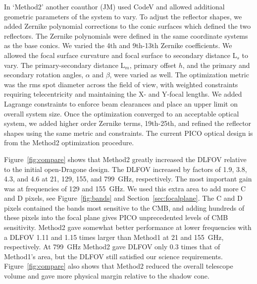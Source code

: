 \documentclass[]{spie}  %
\newcommand{\comr}[1]{\textcolor{red}{#1}}
\begin{document}
In `Method2' another coauthor (JM) used 
CodeV and allowed additional geometric parameters of the system to vary.  To adjust the 
reflector shapes, we added Zernike polynomial corrections to the conic surfaces which defined the two reflectors.
The Zernike polynomials were defined in the same coordinate systems as the base conics.  
We varied the 4th and 9th-13th Zernike coefficients. We allowed the focal surface curvature 
and focal surface to secondary distance L$_s$ to vary.  The primary-secondary distance L$_m$, primary offset $h$, 
and the primary and secondary rotation angles, $\alpha$ and $\beta$, were varied as well.  The optimization 
metric was the rms spot diameter across the field of view, with weighted constraints requiring telecentricity and 
maintaining the X- and Y-focal lengths.  We added Lagrange constraints 
to enforce beam clearances and place an upper limit on overall system size.  Once the optimization converged to 
an acceptable optical system, we added higher order Zernike terms, 19th-25th, and refined 
the reflector shapes using the same metric and constraints. 
The current PICO optical design is from the Method2 optimization procedure.  %

Figure~\ref{fig:compare} shows that Method2 greatly increased the DLFOV relative to the initial open-Dragone design.  
The DLFOV increased by factors of 1.9, 3.8, 4.3, and 4.6 at 21, 129, 155, and 799~GHz, respectively.  
The most important gain was at frequencies of 129 and 155~GHz. We used this extra area to add 
more C and D pixels, see Figure~\ref{fig:bands} and Section~\ref{sec:focalplane}. The C and D pixels contained the bands 
most sensitive to the CMB, and adding hundreds of these pixels into the focal plane  
gives PICO unprecedented levels of CMB sensitivity. 
Method2 gave somewhat better performance at lower 
frequencies with a DLFOV 1.11 and 1.15 times larger than Method1 at 21 and 155~GHz, respectively.
At 799~GHz Method2 gave DLFOV only 0.3 times that of Method1's area, but the DLFOV still satisfied our science 
requirements. 
Figure~\ref{fig:compare} also shows that Method2 reduced the overall telescope volume and gave more 
physical margin relative to the shadow cone.
\end{document}
